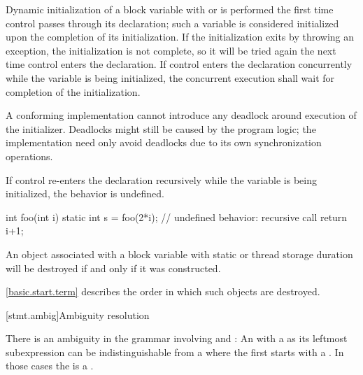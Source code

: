 \pnum
{}%
%
%
%
Dynamic initialization of a block variable with
 or
 is performed
the first time control passes through its declaration; such a variable is
considered initialized upon the completion of its initialization. If the
initialization exits by throwing an exception, the initialization is not
complete, so it will be tried again the next time control enters the
declaration.
If control enters the declaration concurrently while the variable is
being initialized, the concurrent execution shall wait for completion
of the initialization.
\begin{note}
A conforming implementation cannot introduce
any deadlock around execution of the initializer.
Deadlocks might still be caused by the program logic;
the implementation need only avoid deadlocks
due to its own synchronization operations.
\end{note}
If control
re-enters the declaration recursively while
the variable is being initialized, the behavior is undefined.
\begin{example}
\begin{codeblock}
int foo(int i) {
  static int s = foo(2*i);      // undefined behavior: recursive call
  return i+1;
}
\end{codeblock}
\end{example}

\pnum
{}%
An object associated with
a block variable with static or thread storage duration
will be destroyed if and only if it was constructed.
\begin{note}
\ref{basic.start.term} describes the order in which such objects are destroyed.
\end{note}

[stmt.ambig]{Ambiguity resolution}%

\pnum
There is an ambiguity in the grammar involving
 and : An
 with a  as its leftmost subexpression can be
indistinguishable from a  where the first
 starts with a \tcode{(}. In those cases the
 is a .

